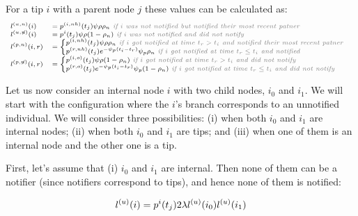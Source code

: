 \documentclass[a4paper,10pt]{article}
\begin{document}
For a tip $i$ with a parent node $j$ these values can be calculated as:
\begin{equation}
\scriptsize
\begin{array}{ll}
l^{(u,n)}(i) &= p^{(i,nh)}(t_j)\psi\rho
\rho_{n} \textit{\color{gray} ~if $i$ was not notified but notified their most recent patner}\\
l^{(u,\not{n})}(i) &= p^{i}(t_j)\psi\rho (1-\rho_{n}) \textit{\color{gray} ~if $i$ was not notified and did not notify}\\
l^{(p,n)}(i,r) &= \begin{cases}
p^{(i, nh)}(t_j)\psi\rho\rho_{n} \textit{\color{gray} ~if $i$ got notified at time $t_r > t_i$ and notified their most recent patner}\\
p^{(r, nh)}(t_j) e^{- \psi_p (t_i - t_r)} \psi_p \rho_{n} \textit{\color{gray} ~if $i$ got notified at time $t_r \leq t_i$ and notified}
\end{cases}\\
l^{(p,\not{n})}(i,r) &= \begin{cases}
p^{(i, o)}(t_j)\psi\rho(1 - \rho_{n}) \textit{\color{gray} ~if $i$ got notified at time $t_r > t_i$ and did not notify}\\
p^{(r, o)}(t_j) e^{- \psi_p (t_i - t_r)} \psi_p (1-\rho_{n}) \textit{\color{gray} ~if $i$ got notified at time $t_r \leq t_i$ and did not notify}
\end{cases}\\
\end{array}
\label{eq:tip}
\end{equation}

Let us now consider an internal node $i$ with two child nodes, $i_0$ and $i_1$. We will start with the configuration where the $i$'s branch corresponds to an unnotified individual. We will consider three possibilities: (i) when both $i_0$ and $i_1$ are internal nodes; (ii) when both $i_0$ and $i_1$ are tips; and (iii) when one of them is an internal node and the other one is a tip.


First, let's assume that (i) $i_0$ and $i_1$ are internal. Then none of them can be a notifier (since notifiers correspond to tips), and hence none of them is notified:

\begin{equation}
\scriptsize
l^{(u)}(i) = p^{i}(t_j) 2\lambda l^{(u)}(i_0)l^{(u)}(i_1) \label{eq:lu-int-int}
\end{equation}
\end{document}
